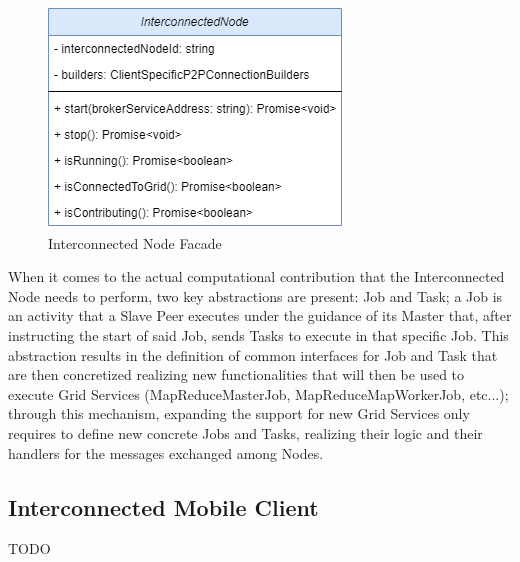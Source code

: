 \begin{figure}[!ht]
    \centering
    \includegraphics[scale=0.6]{document/chapters/chapter_7/images/interconnected_node_facade.png}
    \caption{Interconnected Node Facade}
    \label{fig:interconnected_node_facade}
\end{figure}

When it comes to the actual computational contribution that the Interconnected Node needs to perform, two key abstractions are present: Job and Task; a Job is an activity that a Slave Peer executes under the guidance of its Master that, after instructing the start of said Job, sends Tasks to execute in that specific Job. This abstraction results in the definition of common interfaces for Job and Task that are then concretized realizing new functionalities that will then be used to execute Grid Services (MapReduceMasterJob, MapReduceMapWorkerJob, etc...); through this mechanism, expanding the support for new Grid Services only requires to define new concrete Jobs and Tasks, realizing their logic and their handlers for the messages exchanged among Nodes.

\subsection{Interconnected Mobile Client}
TODO

